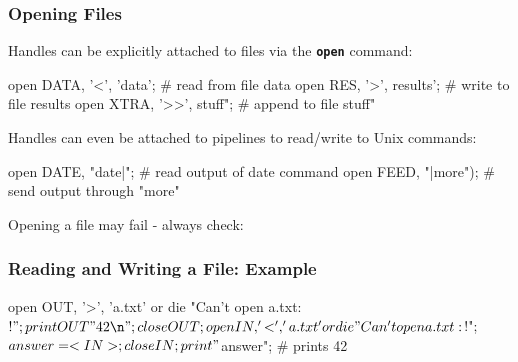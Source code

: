 
\begin{frame}
\frametitle{Opening Files}
Handles can be explicitly attached to files via the \textbf{\tt{open}} command:

\begin{perl}
open DATA, '<', 'data';   # read from file data
open RES, '>',  results'; # write to file results
open XTRA, '>>', stuff";  # append to file stuff"
\end{perl}

Handles can even be attached to pipelines to read/write to Unix commands:
\begin{perl}
open DATE, "date|";  # read output of date command
open FEED, "|more"); # send output through "more"
\end{perl}

Opening a file may fail - always check:

\end{frame}

\begin{frame}
\frametitle{Reading and Writing a File: Example}

\begin{perl}
open OUT, '>', 'a.txt' or die "Can't open a.txt: $!";
print OUT "42\n";
close OUT;
open IN, '<', 'a.txt' or die "Can't open a.txt: $!";
$answer = <IN>;
close IN;
print "$answer\n"; # prints 42
\end{perl}
\end{frame}

